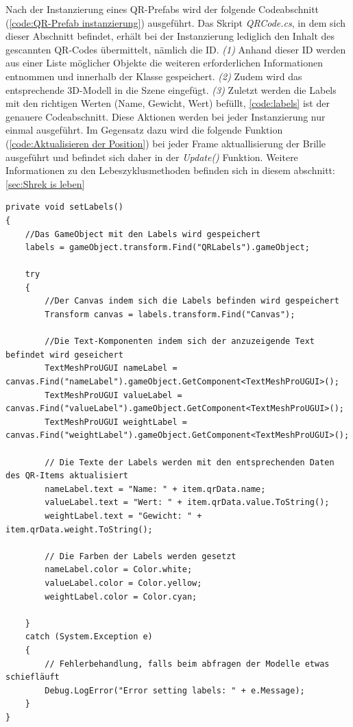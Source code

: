 Nach der Instanzierung eines QR-Prefabs wird der folgende Codeabschnitt (\ref{code:QR-Prefab instanzierung}) ausgeführt. Das Skript \textit{QRCode.cs}, in dem sich dieser Abschnitt befindet, erhält bei der Instanzierung lediglich den Inhalt des gescannten QR-Codes übermittelt, nämlich die ID. \textit{(1)} Anhand dieser ID werden aus einer Liste möglicher Objekte die weiteren erforderlichen Informationen entnommen und innerhalb der Klasse gespeichert. \textit{(2)} Zudem wird das entsprechende 3D-Modell in die Szene eingefügt. \textit{(3)} Zuletzt werden die Labels mit den richtigen Werten (Name, Gewicht, Wert) befüllt, \ref{code:labels} ist der genauere Codeabschnitt. Diese Aktionen werden bei jeder Instanzierung nur einmal ausgeführt. Im Gegensatz dazu wird die folgende Funktion (\ref{code:Aktualisieren der Position}) bei jeder Frame aktuallisierung der Brille ausgeführt und befindet sich daher in der \textit{Update()} Funktion. Weitere Informationen zu den Lebeszyklusmethoden befinden sich in diesem abschnitt: \ref{sec:Shrek is leben}

\begin{lstlisting}[style=csharp, caption={Setzen der Labels}, label=code:labels]
private void setLabels()
{
    //Das GameObject mit den Labels wird gespeichert
    labels = gameObject.transform.Find("QRLabels").gameObject;

    try
    {
        //Der Canvas indem sich die Labels befinden wird gespeichert
        Transform canvas = labels.transform.Find("Canvas");

        //Die Text-Komponenten indem sich der anzuzeigende Text befindet wird geseichert
        TextMeshProUGUI nameLabel = canvas.Find("nameLabel").gameObject.GetComponent<TextMeshProUGUI>();
        TextMeshProUGUI valueLabel = canvas.Find("valueLabel").gameObject.GetComponent<TextMeshProUGUI>();
        TextMeshProUGUI weightLabel = canvas.Find("weightLabel").gameObject.GetComponent<TextMeshProUGUI>();

        // Die Texte der Labels werden mit den entsprechenden Daten des QR-Items aktualisiert
        nameLabel.text = "Name: " + item.qrData.name;
        valueLabel.text = "Wert: " + item.qrData.value.ToString();
        weightLabel.text = "Gewicht: " + item.qrData.weight.ToString();

        // Die Farben der Labels werden gesetzt
        nameLabel.color = Color.white;
        valueLabel.color = Color.yellow;
        weightLabel.color = Color.cyan;

    }
    catch (System.Exception e)
    {
        // Fehlerbehandlung, falls beim abfragen der Modelle etwas schiefläuft
        Debug.LogError("Error setting labels: " + e.Message);
    }
}
\end{lstlisting}

